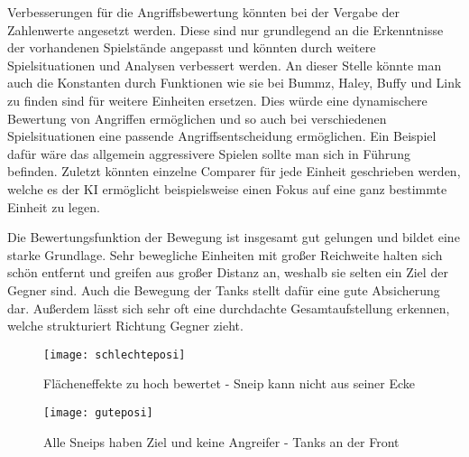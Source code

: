 Verbesserungen für die Angriffsbewertung könnten bei der Vergabe der Zahlenwerte angesetzt werden. Diese sind nur grundlegend an die Erkenntnisse der vorhandenen Spielstände angepasst und könnten durch weitere Spielsituationen und Analysen verbessert werden. An dieser Stelle könnte man auch die Konstanten durch Funktionen wie sie bei Bummz, Haley, Buffy und Link zu finden sind für weitere Einheiten ersetzen. Dies würde eine dynamischere Bewertung von Angriffen ermöglichen und so auch bei verschiedenen Spielsituationen eine passende Angriffsentscheidung ermöglichen. Ein Beispiel dafür wäre das allgemein aggressivere Spielen sollte man sich in Führung befinden. Zuletzt könnten einzelne Comparer für jede Einheit geschrieben werden, welche es der KI ermöglicht beispielsweise einen Fokus auf eine ganz bestimmte Einheit zu legen. 

Die Bewertungsfunktion der Bewegung ist insgesamt gut gelungen und bildet eine starke Grundlage. Sehr bewegliche Einheiten mit großer Reichweite halten sich schön entfernt und greifen aus großer Distanz an, weshalb sie selten ein Ziel der Gegner sind. Auch die Bewegung der Tanks stellt dafür eine gute Absicherung dar. Außerdem lässt sich sehr oft eine durchdachte Gesamtaufstellung erkennen, welche strukturiert Richtung Gegner zieht. 

\begin{figure}[H]
	\begin{minipage}[b]{.4\linewidth} %
		\texttt{[image: schlechteposi]}
		\caption{Flächeneffekte zu hoch bewertet - Sneip kann nicht aus seiner Ecke}
	\end{minipage}
	\hspace{.1\linewidth}%
	\begin{minipage}[b]{.4\linewidth} %
		\texttt{[image: guteposi]}
		\caption{Alle Sneips haben Ziel und keine Angreifer - Tanks an der Front}
	\end{minipage}
\end{figure}

